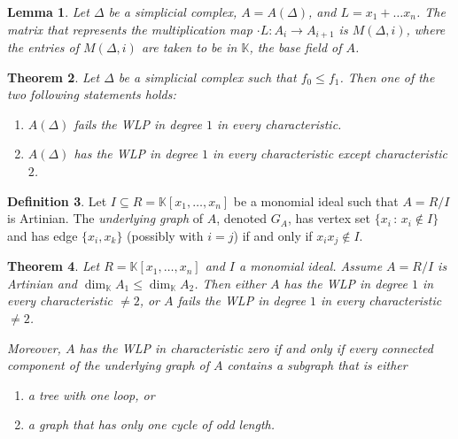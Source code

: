 \documentclass[12pt,a4paper]{article}
\newcommand{\KK}{\mathbb{K}}
\newtheorem{theorem}{Theorem}[section]
\newtheorem{lemma}[theorem]{Lemma}
\theoremstyle{definition}
\newtheorem{definition}[theorem]{Definition}
\numberwithin{equation}{section}
\begin{document}
\begin{lemma}{\cite[Lemma 23]{holleben_weak_2024}}
    Let $\Delta$ be a simplicial complex, $A = A(\Delta)$, and $L = x_1 + \dots x_n$.
    The matrix that represents the multiplication map $\cdot L \colon A_i \to A_{i+1}$ is $M(\Delta, i)$, where the entries of $M(\Delta,i)$ are taken to be in $\KK$, the base field of $A$.
\end{lemma}

\begin{theorem}{\cite[Theorem 54]{holleben_weak_2024}}
    Let $\Delta$ be a simplicial complex such that $f_0 \leq f_1$.
    Then one of the two following statements holds:
    \begin{enumerate}[label=(\arabic*)]
        \item $A(\Delta)$ fails the WLP in degree $1$ in every characteristic.

        \item $A(\Delta)$ has the WLP in degree $1$ in every characteristic except characteristic $2$.
    \end{enumerate}
\end{theorem}

\begin{definition}{\cite[Definition 55]{holleben_weak_2024}}
    Let $I \subseteq R = \KK[x_1,\dots,x_n]$ be a monomial ideal such that $A = R/I$ is Artinian.
    The \emph{underlying graph} of $A$, denoted $G_A$, has vertex set $\{ x_i \, \colon \, x_i \not\in I \}$ and has edge $\{ x_i, x_k \}$ (possibly with $i=j$) if and only if $x_i x_j \not\in I$.
\end{definition}

\begin{theorem}{\cite[Theorem 58]{holleben_weak_2024}}
    Let $R = \KK[x_1,\dots,x_n]$ and $I$ a monomial ideal.
    Assume $A = R/I$ is Artinian and $\dim_{\KK}{A_1} \leq \dim_{\KK}{A_2}$.
    Then either $A$ has the WLP in degree $1$ in every characteristic $\neq 2$, or $A$ fails the WLP in degree $1$ in every characteristic $\neq 2$.

    Moreover, $A$ has the WLP in characteristic zero if and only if every connected component of the \emph{underlying graph} of $A$ contains a subgraph that is either
    \begin{enumerate}[label=(\arabic*)]
        \item a tree with one loop, or
        
        \item a graph that has only one cycle of odd length.
    \end{enumerate}
\end{theorem}
\end{document}
